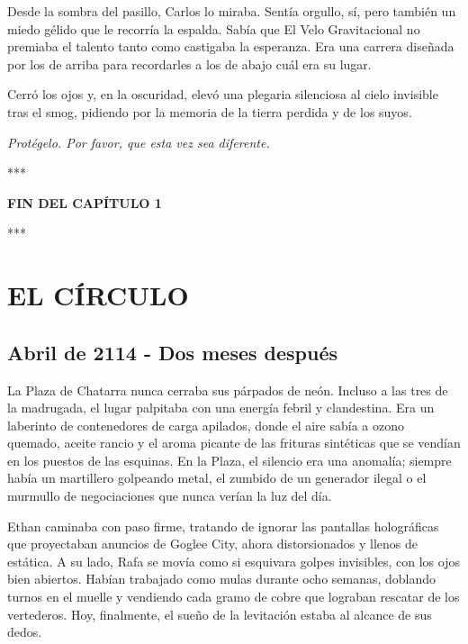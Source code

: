 \documentclass[11pt,twoside]{book}
\begin{document}
Desde la sombra del pasillo, Carlos lo miraba. Sentía orgullo, sí, pero también un miedo gélido que le recorría la espalda. Sabía que El Velo Gravitacional no premiaba el talento tanto como castigaba la esperanza. Era una carrera diseñada por los de arriba para recordarles a los de abajo cuál era su lugar.

Cerró los ojos y, en la oscuridad, elevó una plegaria silenciosa al cielo invisible tras el smog, pidiendo por la memoria de la tierra perdida y de los suyos.

\textit{Protégelo. Por favor, que esta vez sea diferente.}

\bigskip
\begin{center}***\end{center}
\bigskip

\textbf{FIN DEL CAPÍTULO 1}


\bigskip
\begin{center}***\end{center}
\bigskip

\chapter{EL CÍRCULO}

\section*{Abril de 2114 - Dos meses después}

La Plaza de Chatarra nunca cerraba sus párpados de neón. Incluso a las tres de la madrugada, el lugar palpitaba con una energía febril y clandestina. Era un laberinto de contenedores de carga apilados, donde el aire sabía a ozono quemado, aceite rancio y el aroma picante de las frituras sintéticas que se vendían en los puestos de las esquinas. En la Plaza, el silencio era una anomalía; siempre había un martillero golpeando metal, el zumbido de un generador ilegal o el murmullo de negociaciones que nunca verían la luz del día.

Ethan caminaba con paso firme, tratando de ignorar las pantallas holográficas que proyectaban anuncios de Goglee City, ahora distorsionados y llenos de estática. A su lado, Rafa se movía como si esquivara golpes invisibles, con los ojos bien abiertos. Habían trabajado como mulas durante ocho semanas, doblando turnos en el muelle y vendiendo cada gramo de cobre que lograban rescatar de los vertederos. Hoy, finalmente, el sueño de la levitación estaba al alcance de sus dedos.
\end{document}
